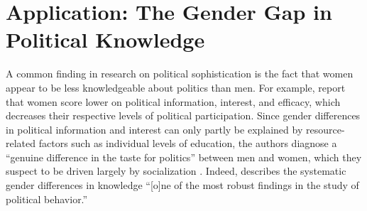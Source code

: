 \documentclass[12pt]{article}
\begin{document}


\section*{Application: The Gender Gap in Political Knowledge}



A common finding in research on political sophistication is the fact that women appear to be less knowledgeable about politics than men. For example, \citet{verba1997knowing} report that women score lower on political information, interest, and efficacy, which decreases their respective levels of political participation. Since gender differences in political information and interest can only partly be explained by resource-related factors such as individual levels of education, the authors diagnose a ``genuine difference in the taste for politics'' between men and women, which they suspect to be driven largely by socialization \citep[see also][]{wolak2011roots}. Indeed, \citet[117]{dow2009gender} describes the systematic gender differences in knowledge ``[o]ne of the most robust findings in the study of political behavior.''
\end{document}
